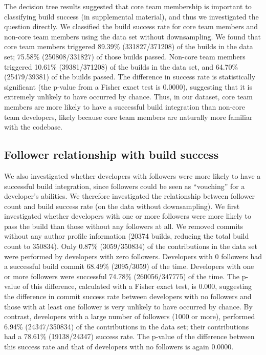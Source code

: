 \documentclass[10pt, conference]{IEEEtran}
\begin{document}
The decision tree results suggested that core team membership is
important to classifying build success (in supplemental material), and thus 
we investigated the question
directly. 
We classified the build success rate for
core team members and non-core team members using the data set without 
downsampling.  We found that core team members
triggered 89.39\% (331827/371208) of the builds in the data set; 75.58\%
(250808/331827) of those builds
passed.  Non-core team members triggered 10.61\% (39381/371208) of the builds 
in the data set,
and 64.70\% (25479/39381) of the builds passed.  The difference in success rate
is statistically significant (the p-value from a Fisher exact
test is 0.0000), suggesting that it is extremely unlikely to have occurred by
chance. Thus, in our dataset, core team 
members are more
likely to have a successful build integration than non-core team developers, likely
because core team members are naturally more familiar with the 
codebase. 



\subsection{Follower relationship with build success}
\label{sec:followerSuccess}

We also investigated whether developers with followers were more likely to have a
successful build integration, since followers could be seen as ``vouching'' for
a developer's abilities.  We therefore investigated the relationship between
follower count and build success rate (on the data without 
downsampling).  We first investigated whether developers with one or more followers
were more likely to pass the build than those without any followers at all. We
removed commits without any author profile
information (20374 builds, reducing the total build count to
350834). Only 0.87\% (3059/350834) of the
contributions in the data set were performed by developers with zero 
followers.  %
Developers with 0 followers had a successful build commit 68.49\% (2095/3059)
of the time.  Developers with one or more followers were successful 74.78\%
(260056/347775) of the time.  The p-value of this difference, calculated with a
Fisher exact test, is 0.000, suggesting the difference in commit success rate between
developers with no followers and those with at least one follower is
very unlikely to have occurred by chance.
%
By contrast, developers with a large number of followers (1000 or more),
performed 6.94\% (24347/350834) of the contributions in the 
data set; their
contributions had a 78.61\% (19138/24347) success rate. The p-value of the
difference between this success rate and that of developers with no
followers is again 0.0000.  %
\end{document}
